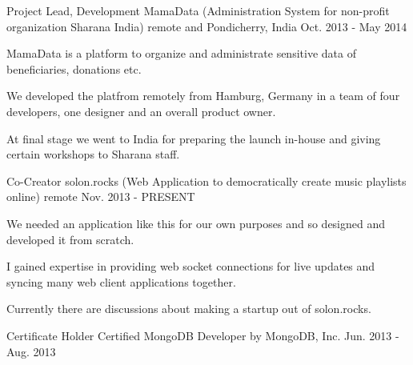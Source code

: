

\begin{cventries}

\cventry
  {Project Lead, Development}
  {MamaData (Administration System for non-profit organization Sharana India)}
  {remote and Pondicherry, India}
  {Oct. 2013 - May 2014}
  {
    \begin{cvitems}
      \item {MamaData is a platform to organize and administrate sensitive data of beneficiaries, donations etc.
      }
      \item {We developed the platfrom remotely from Hamburg, Germany in a team of four developers, one designer and an overall product owner.}
      \item {At final stage we went to India for preparing the launch in-house and giving certain workshops to Sharana staff.
      }
    \end{cvitems}
  }
\cventry
  {Co-Creator}
  {solon.rocks (Web Application to democratically create music playlists online)}
  {remote}
  {Nov. 2013 - PRESENT}
  {
    \begin{cvitems}
      \item {We needed an application like this for our own purposes and so designed and developed it from scratch.}
      \item {I gained expertise in providing web socket connections for live updates and syncing many web client applications together.}
      \item {Currently there are discussions about making a startup out of solon.rocks.}
    \end{cvitems}
  }
\cventry
  {Certificate Holder}
  {Certified MongoDB Developer}
  {by MongoDB, Inc.}
  {Jun. 2013 - Aug. 2013}
  {}

\end{cventries}
